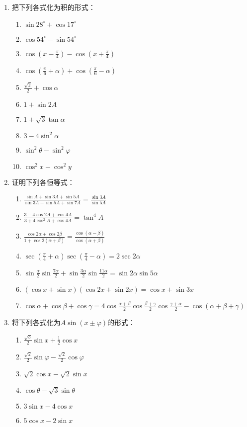 \begin{enumerate}
\item 把下列各式化为积的形式：
\begin{multicols}{2}
\begin{enumerate}[(1)]
    \item $\sin 28^{\circ}+\cos 17^{\circ}$
    \item $\cos 54^{\circ}-\sin 54^{\circ}$
    \item $\cos\left(x-\frac{\pi}{4}\right)-\cos\left(x+\frac{\pi}{4}\right)$
    \item $\cos\left(\frac{\pi}{6}+\alpha\right)+\cos\left(\frac{\pi}{6}-\alpha\right)$
    \item $\frac{\sqrt{2}}{2}+\cos\alpha$
    \item $1+\sin 2A$
    \item $1+\sqrt{3}\tan\alpha$
    \item $3-4\sin^2\alpha$
    \item $\sin^2\theta-\sin^2\varphi$
    \item $\cos^2 x-\cos^2 y$
\end{enumerate}
\end{multicols}

\item 证明下列各恒等式：
\begin{enumerate}[(1)]
    \item $\frac {\sin A+ \sin 3A+ \sin 5A}{\sin 3A+ \sin 5A+ \sin 7A}= \frac {\sin 3A}{\sin 5A}$ 
    \item $\frac {3- 4\cos 2A+ \cos 4A}{3+ 4\cos ^{2}A+ \cos 4A}=\tan^4A$
    \item $\frac {\cos 2\alpha + \cos 2\beta }{1+ \cos 2( \alpha + \beta ) }= \frac {\cos ( \alpha - \beta ) }{\cos ( \alpha + \beta ) }$ 
    \item $\sec\left(\frac{\pi}{4}+\alpha\right)\sec\left(\frac{\pi}{4}-\alpha\right)=2\sec2\alpha$
    \item $\sin \frac \alpha 2\sin \frac {7\alpha }2+ \sin \frac {3\alpha }2\sin \frac {11\alpha }2= \sin 2\alpha\sin5\alpha$
    \item $(\cos x+\sin x)(\cos2x+\sin2x)=\cos x+\sin3x$
    \item $\cos\alpha+\cos\beta+\cos\gamma= 4\cos \frac {\alpha + \beta }2\cos \frac {\beta + \gamma }2\cos \frac {\gamma + \alpha }2- \cos ( \alpha + \beta + \gamma )$ 
\end{enumerate}

\item 将下列各式化为$A\sin(x\pm\varphi)$的形式：
\begin{multicols}{2}
\begin{enumerate}[(1)]
    \item $\frac{\sqrt{3}}{2}\sin x+\frac{1}{2}\cos x$
    \item $\frac{\sqrt{2}}{2}\sin\varphi-\frac{\sqrt{2}}{2}\cos\varphi$
    \item $\sqrt{2}\cos x-\sqrt{2}\sin x$
    \item $\cos\theta-\sqrt{3}\sin\theta$
    \item $3\sin x-4\cos x$
    \item $5\cos x-2\sin x$
\end{enumerate}
\end{multicols}


\end{enumerate}
